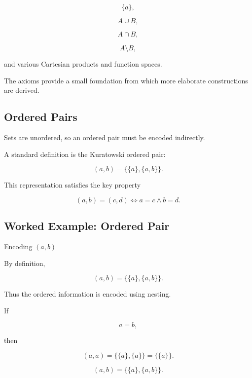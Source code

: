 \[
\boxed{
\{a\},
}
\]

\[
\boxed{
A\cup B,
}
\]

\[
\boxed{
A\cap B,
}
\]

\[
\boxed{
A\setminus B,
}
\]

and various Cartesian products and function spaces.

The axioms provide a small foundation from which more elaborate
constructions are derived.

\subsection{Ordered Pairs}
\label{subsec:set-theoretic-ordered-pairs}

Sets are unordered, so an ordered pair must be encoded indirectly.

A standard definition is the Kuratowski ordered pair:

\[
\boxed{
(a,b)
=
\{
\{a\},
\{a,b\}
\}.
}
\]

This representation satisfies the key property

\[
\boxed{
(a,b)
=
(c,d)
\iff
a=c
\land
b=d.
}
\]

\subsection{Worked Example: Ordered Pair}
\label{subsec:worked-ordered-pair}

\begin{workedexamplebox}{Encoding \((a,b)\)}

By definition,

\[
(a,b)
=
\{
\{a\},
\{a,b\}
\}.
\]

Thus the ordered information is encoded using nesting.

If

\[
a=b,
\]

then

\[
(a,a)
=
\{
\{a\},
\{a\}
\}
=
\{\{a\}\}.
\]

\begin{answerbox}
\[
\boxed{
(a,b)
=
\{
\{a\},
\{a,b\}
\}.
}
\]
\end{answerbox}

\end{workedexamplebox}

